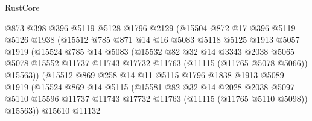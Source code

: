 \begin{lexlean}{RustCore}
\begin{coremodule}
                      @873
                      @398
                      @396
                      @5119
                      @5128
                      @1796
                      @2129
                      (@15504
                        @872
                        @17
                        @396
                        @5119
                        @5126
                        @1938
                        (@15512
                          @785
                          @871
                          @14
                          @16
                          @5083
                          @5118
                          @5125
                          @1913
                          @5057
                          @1919
                          (@15524
                            @785
                            @14
                            @5083
                            (@15532
                              @82
                              @32
                              @14
                              @3343
                              @2038
                              @5065
                              @5078
                              @15552
                              @11737
                              @11743
                              @17732
                              @11763
                              (@11115 (@11765 @5078 @5066))
                              @15563))
                          (@15512
                            @869
                            @258
                            @14
                            @11
                            @5115
                            @1796
                            @1838
                            @1913
                            @5089
                            @1919
                            (@15524
                              @869
                              @14
                              @5115
                              (@15581
                                @82
                                @32
                                @14
                                @2028
                                @2038
                                @5097
                                @5110
                                @15596
                                @11737
                                @11743
                                @17732
                                @11763
                                (@11115 (@11765 @5110 @5098))
                                @15563))
                            @15610
                            @11132

\end{coremodule}
\end{lexlean}
